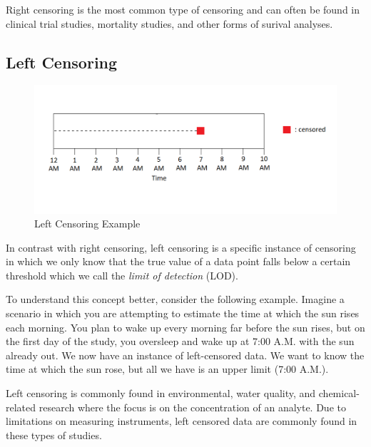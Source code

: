 \documentclass[12pt, twoside]{amherstthesis}
\begin{document}
Right censoring is the most common type of censoring and can often be found in clinical trial studies, mortality studies, and other forms of surival analyses.

\hypertarget{left}{%
\subsection{Left Censoring}\label{left}}
\begin{figure}

{\centering \includegraphics[width=1\linewidth]{figures/left_censoring_example_fix} 

}

\caption{Left Censoring Example}\label{fig:leftcensoringexample}
\end{figure}
In contrast with right censoring, left censoring is a specific instance of censoring in which we only know that the true value of a data point falls below a certain threshold which we call the \emph{limit of detection} (LOD).

To understand this concept better, consider the following example. Imagine a scenario in which you are attempting to estimate the time at which the sun rises each morning. You plan to wake up every morning far before the sun rises, but on the first day of the study, you oversleep and wake up at 7:00 A.M. with the sun already out. We now have an instance of left-censored data. We want to know the time at which the sun rose, but all we have is an upper limit (7:00 A.M.).

Left censoring is commonly found in environmental, water quality, and chemical-related research where the focus is on the concentration of an analyte. Due to limitations on measuring instruments, left censored data are commonly found in these types of studies.
\end{document}
